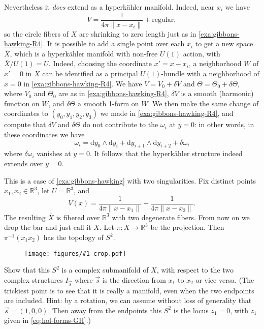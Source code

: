 \documentclass[12pt,letterpaper,reqno]{article}
\numberwithin{equation}{section}
\newcommand{\R}{\ensuremath{\mathbb R}}
\newcommand{\hk}{hyperk\"ahler\xspace}
\newcommand{\de}{\mathrm{d}}
\newcommand{\norm}[1]{\lVert#1\rVert}
\newcommand{\ti}[1]{\textit{#1}}
\newcommand{\insfig}[2]{\begin{figure}[htbp] \centering \texttt{[image: figures/\#1-crop.pdf]} \label{fig:#1} \end{figure}}
\begin{document}
\begin{example}
Nevertheless it \ti{does} extend as a \hk manifold.
Indeed, near $x_i$ we have
\begin{equation}
V = \frac{1}{4\pi\norm{x - x_i}} + \text{regular},
\end{equation}
so the circle fibers of $X$ are shrinking to zero
length just as in \autoref{exa:gibbons-hawking-R4}.
It is possible to add a single point over each $x_i$
to get a new space $\bar X$, which is a \hk manifold with non-free 
$U(1)$ action, with $\bar X / U(1) = U$.
Indeed, choosing the coordinate $x' = x - x_i$,
a neighborhood $W$ of $x' = 0$ in $X$ can be identified as a 
principal $U(1)$-bundle with a neighborhood of $x = 0$
in \autoref{exa:gibbons-hawking-R4}. We have
$V = V_0 + \delta V$ and $\Theta = \Theta_0 + \delta \Theta$,
where $V_0$ and $\Theta_0$ are as in \autoref{exa:gibbons-hawking-R4},
$\delta V$ is a smooth (harmonic) function on $W$, 
and $\delta \Theta$ a smooth 1-form on $W$.
We then make the same change of coordinates 
to $(y_0,y_1,y_2,y_3)$ we made in 
\autoref{exa:gibbons-hawking-R4}, and compute that $\delta V$
and $\delta \Theta$ do not contribute to the $\omega_i$ at
$y=0$: in other words, in these coordinates we have
\begin{equation} \label{eq:gibbons-hawking-near-singularity}
  \omega_i = \de y_0 \wedge \de y_i + \de y_{i+1} \wedge \de y_{i+2} + \delta \omega_i
\end{equation}
where $\delta \omega_i$ vanishes at $y = 0$. It follows
that the \hk structure indeed extends over $y = 0$.
\end{example}

\begin{example} \label{exa:eguchi-hanson}
This is a case of \autoref{exa:gibbons-hawking}
with two singularities. Fix distinct points
$x_1, x_2 \in \R^3$, let $U = \R^3$, and 
\begin{equation}
  V(x) = \frac{1}{4\pi \norm{x - x_1}} + \frac{1}{4\pi \norm{x - x_2}}.
\end{equation}
The resulting $\bar X$ is fibered over $\R^3$ with two degenerate fibers.
From now on we drop the bar and just call it $X$.
Let $\pi: X \to \R^3$ be the projection.
Then $\pi^{-1}(x_1 x_2)$ has the topology of $S^2$.
\end{example}

\insfig{higgs-bundles-3}{0.8}

\begin{exercise}
Show that this $S^2$ is a complex submanifold of $X$, with
respect to the two complex structures $I_{\vec s}$ where $\vec s$
is the direction from $x_1$ to $x_2$ or vice versa.
(The trickiest point is to see that it is really a manifold,
even when the two endpoints are included. Hint: by a rotation,
we can assume without loss of generality that $\vec s = (1,0,0)$.
Then away from the endpoints this $S^2$ is the locus
$z_1 = 0$, with $z_1$ given in \eqref{eq:hol-forms-GH}.)
\end{exercise}
\end{document}
